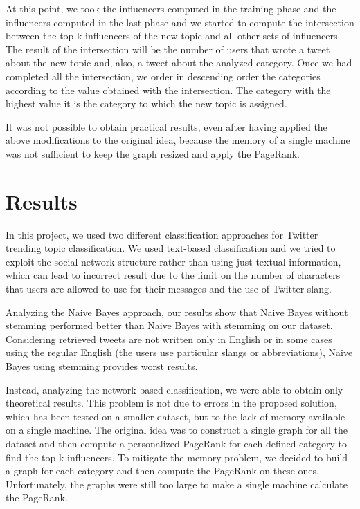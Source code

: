 \documentclass[journal,11pt]{vgtc}
\begin{document}
At this point, we took the influencers computed in the training phase and the influencers computed in the
last phase and we started to compute the intersection between the top-k influencers of the new topic and
all other sets of influencers.
The result of the intersection will be the number of users that wrote a tweet about the new topic and, also,
a tweet about the analyzed category.
Once we had completed all the intersection, we order in descending order the categories according to the
value obtained with the intersection. The category with the highest value it is the category
to which the new topic is assigned.

It was not possible to obtain practical results, even after having applied the above modifications 
to the original idea, because the memory of a single machine was not sufficient to keep the graph 
resized and apply the PageRank.

\section{Results}
In this project, we used two different classification approaches for Twitter trending topic classification.
We used text-based classification and we tried to exploit the social network structure rather than 
using just textual information, which can lead to incorrect result due to the limit on the number of characters 
that users are allowed to use for their messages and the use of Twitter slang.

Analyzing the Naive Bayes approach, our results show that Naive Bayes without stemming 
performed better than Naive Bayes with stemming on our dataset. Considering retrieved tweets are not 
written only in English or in some cases using the regular English (the users use particular slangs or abbreviations),
Naive Bayes using stemming provides worst results.

Instead, analyzing the network based classification, we were able to obtain only theoretical results. 
This problem is not due to errors in the proposed solution, which has been tested on a smaller dataset, 
but to the lack of memory available on a single machine. 
The original idea was to construct a single graph for all the dataset and then compute a personalized
PageRank for each defined category to find the top-k influencers. To mitigate the memory problem, we decided
to build a graph for each category and then compute the PageRank on these ones.
Unfortunately, the graphs were still too large to make a single machine calculate the PageRank.








\end{document}
